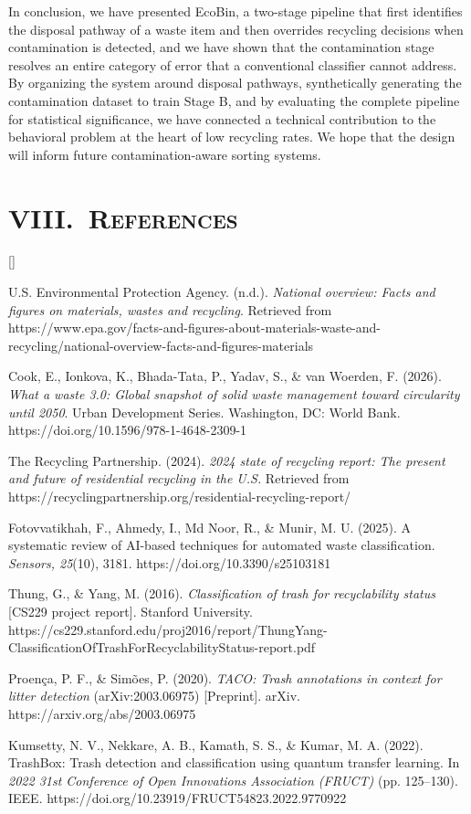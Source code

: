 \documentclass[10pt,twocolumn]{article}
\newenvironment{numrefs}
  {\section*{\centering\normalfont\fontsize{10}{12}\scshape VIII.\ References}
   \begin{list}{[\arabic{enumi}]}{%
      \usecounter{enumi}
      \setlength{\labelwidth}{2.2em}\setlength{\leftmargin}{2.4em}
      \setlength{\labelsep}{0.3em}\setlength{\itemsep}{2pt}\setlength{\parsep}{0pt}
      \footnotesize}}
  {\end{list}}
\begin{document}
In conclusion, we have presented EcoBin, a two-stage pipeline that first identifies the disposal pathway of a waste item and then overrides recycling decisions when contamination is detected, and we have shown that the contamination stage resolves an entire category of error that a conventional classifier cannot address. By organizing the system around disposal pathways, synthetically generating the contamination dataset to train Stage B, and by evaluating the complete pipeline for statistical significance, we have connected a technical contribution to the behavioral problem at the heart of low recycling rates. We hope that the design will inform future contamination-aware sorting systems.

\begin{numrefs}
\item U.S. Environmental Protection Agency. (n.d.). \textit{National overview: Facts and figures on materials, wastes and recycling}. Retrieved from https://www.epa.gov/facts-and-figures-about-materials-waste-and-recycling/national-overview-facts-and-figures-materials
\item Cook, E., Ionkova, K., Bhada-Tata, P., Yadav, S., \& van Woerden, F. (2026). \textit{What a waste 3.0: Global snapshot of solid waste management toward circularity until 2050}. Urban Development Series. Washington, DC: World Bank. https://doi.org/10.1596/978-1-4648-2309-1
\item The Recycling Partnership. (2024). \textit{2024 state of recycling report: The present and future of residential recycling in the U.S.} Retrieved from https://recyclingpartnership.org/residential-recycling-report/
\item Fotovvatikhah, F., Ahmedy, I., Md Noor, R., \& Munir, M. U. (2025). A systematic review of AI-based techniques for automated waste classification. \textit{Sensors, 25}(10), 3181. https://doi.org/10.3390/s25103181
\item Thung, G., \& Yang, M. (2016). \textit{Classification of trash for recyclability status} [CS229 project report]. Stanford University. https://cs229.stanford.edu/proj2016/report/ThungYang-ClassificationOfTrashForRecyclabilityStatus-report.pdf
\item Proença, P. F., \& Simões, P. (2020). \textit{TACO: Trash annotations in context for litter detection} (arXiv:2003.06975) [Preprint]. arXiv. https://arxiv.org/abs/2003.06975
\item Kumsetty, N. V., Nekkare, A. B., Kamath, S. S., \& Kumar, M. A. (2022). TrashBox: Trash detection and classification using quantum transfer learning. In \textit{2022 31st Conference of Open Innovations Association (FRUCT)} (pp. 125--130). IEEE. https://doi.org/10.23919/FRUCT54823.2022.9770922

\end{numrefs}
\end{document}

